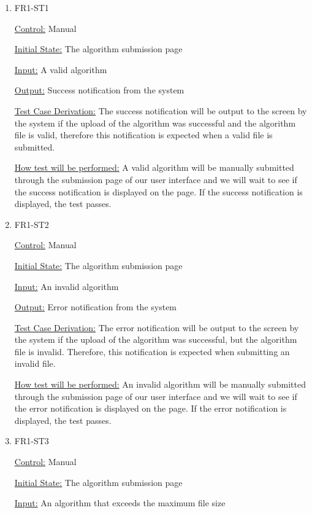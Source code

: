 \documentclass[12pt, titlepage]{article}
\begin{document}
\begin{enumerate}

\item{FR1-ST1\\}

\underline{Control:} Manual

\underline{Initial State:} The algorithm submission page

\underline{Input:} A valid algorithm 

\underline{Output:} Success notification from the system

\underline{Test Case Derivation:} The success notification will be output to the screen by the system if the upload of the algorithm was successful and the algorithm file is valid, therefore this notification is expected when a valid file is submitted. 

\underline{How test will be performed:} A valid algorithm will be manually submitted through the submission page of our user interface and we will wait to see if the success notification is displayed on the page. If the success notification is displayed, the test passes.
					
\item{FR1-ST2\\}

\underline{Control:} Manual

\underline{Initial State:} The algorithm submission page

\underline{Input:} An invalid algorithm

\underline{Output:} Error notification from the system

\underline{Test Case Derivation:} The error notification will be output to the screen by the system if the upload of the algorithm was successful, but the algorithm file is invalid. Therefore, this notification is expected when submitting an invalid file.  

\underline{How test will be performed:} An invalid algorithm will be manually submitted through the submission page of our user interface and we will wait to see if the error notification is displayed on the page. If the error notification is displayed, the test passes.

\item{FR1-ST3\\}

\underline{Control:} Manual

\underline{Initial State:} The algorithm submission page

\underline{Input:} An algorithm that exceeds the maximum file size


\end{enumerate}
\end{document}
